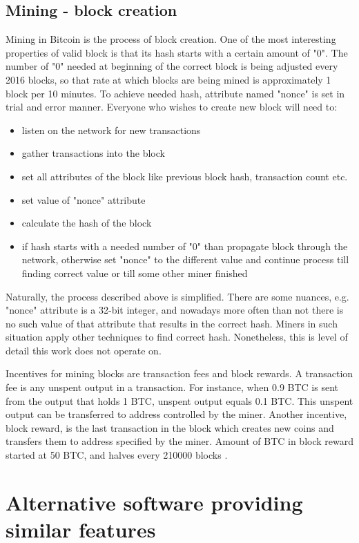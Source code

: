 \documentclass[12pt, en, eng, twoside, final]{mgr}
\begin{document}
\section{Mining - block creation}
Mining in Bitcoin is the process of block creation. One of the most interesting properties of valid block is that its hash starts with a certain amount of "0". The number of "0" needed at beginning of the correct block is being adjusted every 2016 blocks, so that rate at which blocks are being mined is approximately 1 block per 10 minutes. To achieve needed hash, attribute named "nonce" is set in trial and error manner. Everyone who wishes to create new block will need to:

\begin{itemize}
\item
listen on the network for new transactions
\item
gather transactions into the block
\item
set all attributes of the block like previous block hash, transaction count etc.
\item
set value of "nonce" attribute
\item
calculate the hash of the block
\item
if hash starts with a needed number of "0" than propagate block through the network, otherwise set "nonce" to the different value and continue process till finding correct value or till some other miner finished 
\end{itemize}

Naturally, the process described above is simplified. There are some nuances, e.g. "nonce" attribute is a 32-bit integer, and nowadays more often than not there is no such value of that attribute that results in the correct hash. Miners in such situation apply other techniques to find correct hash. Nonetheless, this is level of detail this work does not operate on.
 
Incentives for mining blocks are transaction fees and block rewards. A transaction fee is any unspent output in a transaction. For instance, when 0.9 BTC is sent from the output that holds 1 BTC, unspent output equals 0.1 BTC. This unspent output can be transferred to address controlled by the miner.  
Another incentive, block reward, is the last transaction in the block which creates new coins and transfers them to address specified by the miner. Amount of BTC in block reward started at 50 BTC, and halves every 210000 blocks \cite{currency-supply}.


\chapter{Alternative software providing similar features}
\end{document}
